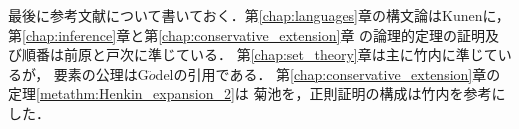 	最後に参考文献について書いておく．第\ref{chap:languages}章の構文論はKunen\cite{Kunen}に，
	第\ref{chap:inference}章と第\ref{chap:conservative_extension}章
	の論理的定理の証明及び順番は前原\cite{Maehara}と戸次\cite{Bekki}に準じている．
	第\ref{chap:set_theory}章は主に竹内\cite{TakeuchiSet}に準じているが，
	要素の公理はG$\ddot{o}$del\cite{Godel}の引用である．
	第\ref{chap:conservative_extension}章の定理\ref{metathm:Henkin_expansion_2}は
	菊池\cite{Kikuchi}を，正則証明の構成は竹内\cite{TakeuchiProof}を参考にした．